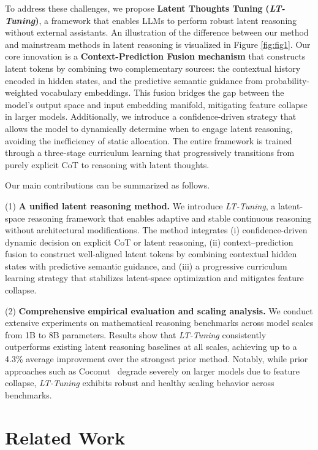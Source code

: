 \documentclass{article}
\theoremstyle{plain}
\theoremstyle{definition}
\theoremstyle{remark}
\begin{document}
To address these challenges, we propose \textbf{Latent Thoughts Tuning} \textbf{(\textit{LT-Tuning})}, a framework that enables LLMs to perform robust latent reasoning without external assistants. An illustration of the difference between our method and mainstream methods in latent reasoning is visualized in Figure \ref{fig:fig1}. Our core innovation is a \textbf{Context-Prediction Fusion mechanism} that constructs latent tokens by combining two complementary sources: the contextual history encoded in hidden states, and the predictive semantic guidance from probability-weighted vocabulary embeddings. This fusion bridges the gap between the model's output space and input embedding manifold, mitigating feature collapse in larger models. Additionally, we introduce a confidence-driven strategy that allows the model to dynamically determine when to engage latent reasoning, avoiding the inefficiency of static allocation. The entire framework is trained through a three-stage curriculum learning that progressively transitions from purely explicit CoT to reasoning with latent thoughts.

Our main contributions can be summarized as follows.

(1) \textbf{A unified latent reasoning method.}
We introduce \textit{LT-Tuning}, a latent-space reasoning framework that enables adaptive and stable continuous reasoning without architectural modifications. The method integrates (i) confidence-driven dynamic decision on explicit CoT or latent reasoning, (ii) context–prediction fusion to construct well-aligned latent tokens by combining contextual hidden states with predictive semantic guidance, and (iii) a progressive curriculum learning strategy that stabilizes latent-space optimization and mitigates feature collapse.

(2) \textbf{Comprehensive empirical evaluation and scaling analysis.}
We conduct extensive experiments on mathematical reasoning benchmarks across model scales from 1B to 8B parameters. Results show that \textit{LT-Tuning} consistently outperforms existing latent reasoning baselines at all scales, achieving up to a 4.3\% average improvement over the strongest prior method. Notably, while prior approaches such as Coconut~\citep{hao2024training} degrade severely on larger models due to feature collapse, \textit{LT-Tuning} exhibits robust and healthy scaling behavior across benchmarks.

\section{Related Work}
\end{document}
